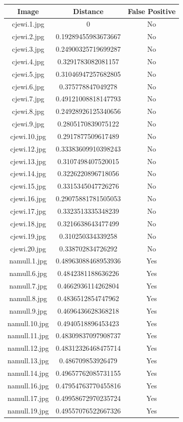 \documentclass[12pt]{article}
\begin{document}
\begin{center}
\begin{tabular}{ccc}
Image & Distance & False Positive \\
\hline
cjewi.1.jpg & 0 & No \\
cjewi.2.jpg & 0.19289455983673667 & No \\
cjewi.3.jpg & 0.24900325719699287 & No \\
cjewi.4.jpg & 0.3291783082081157 & No \\
cjewi.5.jpg & 0.31046947257682805 & No \\
cjewi.6.jpg & 0.375778847049278 & No \\
cjewi.7.jpg & 0.49121008818147793 & No \\
cjewi.8.jpg & 0.24928926125340656 & No \\
cjewi.9.jpg & 0.2805170839075122 & No \\
cjewi.10.jpg & 0.2917877509617489 & No \\
cjewi.12.jpg & 0.33383609910398243 & No \\
cjewi.13.jpg & 0.3107498407520015 & No \\
cjewi.14.jpg & 0.3226220896718056 & No \\
cjewi.15.jpg & 0.3315345047726276 & No \\
cjewi.16.jpg & 0.29075881781505053 & No \\
cjewi.17.jpg & 0.3323513335348239 & No \\
cjewi.18.jpg & 0.3216638643477499 & No \\
cjewi.19.jpg & 0.310250334339258 & No \\
cjewi.20.jpg & 0.338702834726292 & No \\
namull.1.jpg & 0.48963088468953936 & Yes \\
namull.6.jpg & 0.4842381188636226 & Yes \\
namull.7.jpg & 0.4662936114262804 & Yes \\
namull.8.jpg & 0.4836512854747962 & Yes \\
namull.9.jpg & 0.4696436628368218 & Yes \\
namull.10.jpg & 0.4940518896453423 & Yes \\
namull.11.jpg & 0.48309837097908737 & Yes \\
namull.12.jpg & 0.48312326468475714 & Yes \\
namull.13.jpg & 0.486709853926479 & Yes \\
namull.14.jpg & 0.49657762085731155 & Yes \\
namull.16.jpg & 0.47954763770455816 & Yes \\
namull.17.jpg & 0.49958672970235724 & Yes \\
namull.19.jpg & 0.49557076522667326 & Yes \\
\end{tabular}
\end{center}
\end{document}
